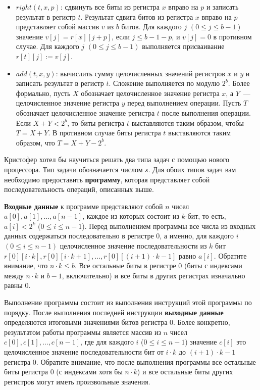 \begin{itemize}
\item $right(t,x,p)$: сдвинуть все биты из регистра $x$ вправо на $p$ и записать результат в регистр $t$. Результат сдвига битов из регистра $x$ вправо на $p$ представляет собой массив $v$ из $b$ битов. Для каждого $j$ $(0 \leq j \leq b-1)$ значение $v[j] = r[x][j+p]$, если $j \leq b - 1 - p$, и $v[j] = 0$ в противном случае. Для каждого $j$ $(0 \leq j \leq b-1)$ выполняется присваивание $r[t][j] := v[j]$.

\item $add(t,x,y)$: вычислить сумму целочисленных значений регистров $x$ и $y$ и записать результат в регистр $t$. Сложение выполняется по модулю $2^b$.
Более формально, пусть $X$ обозначает целочисленное значение регистра $x$, а $Y$~--- целочисленное значение регистра $y$ перед выполнением операции. Пусть $T$ обозначает целочисленное значение регистра $t$ после выполнения операции. Если $X+Y < 2^b$, то биты регистра $t$ выставляются таким образом, чтобы $T = X+Y$.
В противном случае биты регистра $t$ выставляются таким образом, что $T=X+Y-2^b$.
\end{itemize}


Кристофер хотел бы научиться решать два типа задач с помощью нового процессора. Тип задачи обозначается числом $s$. Для обоих типов задач вам необходимо предоставить \textbf{программу}, которая представляет собой последовательность операций, описанных выше.

\textbf{Входные данные} к программе представляют собой $n$ чисел $a[0],a[1],\ldots,a[n-1]$, каждое из которых состоит из $k$-бит, то есть, $a[i] < 2^k$ ($0 \leq i \leq n-1$).
Перед выполнением программы все числа из входных данных содержаться последовательно в регистре $0$, а именно, для каждого $i$ $(0 \leq i \leq n-1)$ целочисленное значение последовательности из $k$ бит $r[0][i \cdot k], r[0][i \cdot k + 1], \ldots, r[0][(i+1) \cdot k - 1]$ равно $a[i]$. Обратите внимание, что $n \cdot k \leq b$.
Все остальные биты в регистре $0$ (биты с индексами между $n \cdot k$ и $b-1$, включительно) и все биты в других регистрах изначально равны $0$.

Выполнение программы состоит из выполнения инструкций этой программы по порядку.
После выполнения последней инструкции \textbf{выходные данные} определяются итоговыми значениями битов регистра $0$.
Более конкретно, результатом работы программы является массив из $n$ чисел $c[0], c[1], \ldots, c[n-1]$, где для каждого $i$ ($0 \leq i \leq n-1$) значение $c[i]$ это целочисленное значение последовательности бит от $i\cdot k$ до $(i + 1)\cdot k-1$ регистра $0$.
Обратите внимание, что после выполнения программы все остальные биты регистра $0$ (с индексами хотя бы $n \cdot k$) и все остальные биты других регистров могут иметь произвольные значения.

